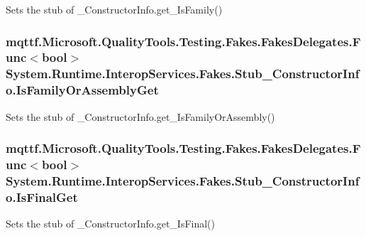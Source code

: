 Sets the stub of \-\_\-\-Constructor\-Info.\-get\-\_\-\-Is\-Family()

\hypertarget{class_system_1_1_runtime_1_1_interop_services_1_1_fakes_1_1_stub___constructor_info_a1976c04db3bc42e131c55033d046c274}{
\subsubsection[{Is\-Family\-Or\-Assembly\-Get}]{\setlength{\rightskip}{0pt plus 5cm}mqttf.\-Microsoft.\-Quality\-Tools.\-Testing.\-Fakes.\-Fakes\-Delegates.\-Func$<$bool$>$ System.\-Runtime.\-Interop\-Services.\-Fakes.\-Stub\-\_\-\-Constructor\-Info.\-Is\-Family\-Or\-Assembly\-Get}}\label{class_system_1_1_runtime_1_1_interop_services_1_1_fakes_1_1_stub___constructor_info_a1976c04db3bc42e131c55033d046c274}


Sets the stub of \-\_\-\-Constructor\-Info.\-get\-\_\-\-Is\-Family\-Or\-Assembly()

\hypertarget{class_system_1_1_runtime_1_1_interop_services_1_1_fakes_1_1_stub___constructor_info_a906f0c6c1a33694caf38fce03b3dd7f6}{
\subsubsection[{Is\-Final\-Get}]{\setlength{\rightskip}{0pt plus 5cm}mqttf.\-Microsoft.\-Quality\-Tools.\-Testing.\-Fakes.\-Fakes\-Delegates.\-Func$<$bool$>$ System.\-Runtime.\-Interop\-Services.\-Fakes.\-Stub\-\_\-\-Constructor\-Info.\-Is\-Final\-Get}}\label{class_system_1_1_runtime_1_1_interop_services_1_1_fakes_1_1_stub___constructor_info_a906f0c6c1a33694caf38fce03b3dd7f6}


Sets the stub of \-\_\-\-Constructor\-Info.\-get\-\_\-\-Is\-Final()

